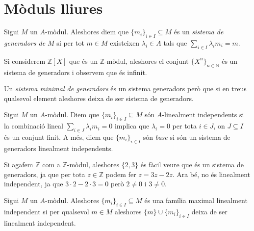 \documentclass[../../../main.tex]{subfiles}
\begin{document}
\section{Mòduls lliures}

\begin{defi}
\label{def:sistemaGeneradors} Sigui $M$ un $A$-mòdul. Aleshores diem que $\{m_i\}_{i\in I}\subseteq M$ és un \textit{sistema de generadors de $M$} si per tot $m\in M$ existeixen $\lambda_i\in A$ tals que $\sum_{i\in I}\lambda_im_i = m$.
\end{defi}


\begin{ej}
Si considerem $\mathbb{Z}[X]$ que és un $\mathbb{Z}$-mòdul, aleshores el conjunt $\{X^n\}_{n\in\mathbb{N}}$ és un sistema de generadors i observem que és infinit.
\end{ej}

\begin{defi}
\label{def:sistemaMinimalGeneradors} Un \textit{sistema minimal de generadors} és un sistema generadors però que si en treus qualsevol element aleshores deixa de ser sistema de generadors.
\end{defi}

\begin{defi}
\label{def:linealmentIndependents} Sigui $M$ un $A$-mòdul. Diem que $\{m_i\}_{i\in I}\subseteq M$ són $A$-linealment independents si la combinació lineal $\sum_{i \in J}\lambda_im_i = 0$ implica que $\lambda_i = 0$ per tota $i\in J$, on $J\subseteq I$ és un conjunt finit. A més, diem que $\{m_i\}_{i\in I}$ són \textit{base} si són un sistema de generadors linealment independents.
\end{defi}


\begin{ej}
Si agafem $\mathbb{Z}$ com a $\mathbb{Z}$-mòdul, aleshores $\{2,3\}$ és fàcil veure que és un sistema de generadors, ja que per tota $z\in\mathbb{Z}$ podem fer $z = 3z-2z$. Ara bé, no és linealment independent, ja que $3\cdotp 2-2\cdotp 3 = 0$ però $2\not=0$ i $3\not=0$.
\end{ej}

\begin{defi}
 Sigui $M$ un $A$-mòdul. Aleshores $\{m_i\}_{i\in I}\subseteq M$ és una família maximal linealment independent si per qualsevol $m\in M$ aleshores $\{m\}\cup\{m_i\}_{i\in I}$ deixa de ser linealment independent.
\end{defi}
\end{document}
